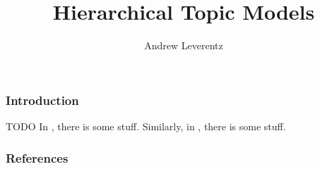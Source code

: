 \documentclass{beamer}
\title{Hierarchical Topic Models}
\author{Andrew Leverentz}
\date{}
\begin{document}
\begin{frame}
\titlepage
\end{frame}

\begin{frame}
\frametitle{Introduction}
TODO
In \cite{paisley2015nested}, there is some stuff.
Similarly, in \cite{blei2010nested}, there is some stuff.
\end{frame}


{
\begin{frame}[allowframebreaks]
\frametitle{References}
\nocite{*}
%
%


\end{frame}
}
\end{document}
